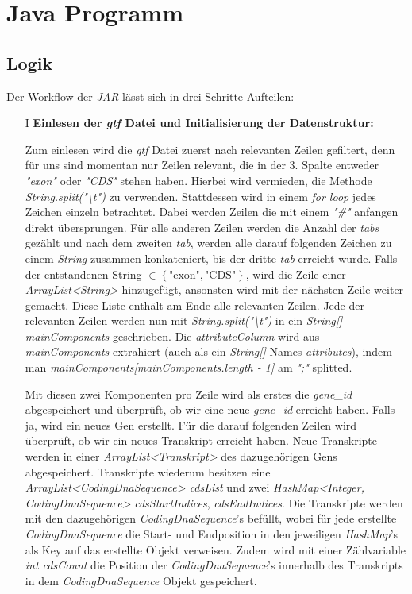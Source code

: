 \documentclass[12pt]{article}
\begin{document}
\section{Java Programm}
\subsection{Logik}
Der Workflow der \textit{JAR} lässt sich in drei Schritte Aufteilen:
\begin{enumerate}
    \item[I] \textbf{Einlesen der \textit{gtf} Datei und Initialisierung der Datenstruktur:}

        Zum einlesen wird die \textit{gtf} Datei zuerst nach relevanten Zeilen gefiltert, denn
        für uns sind momentan nur Zeilen relevant, die in der 3. Spalte entweder
        \textit{"exon"} oder \textit{"CDS"} stehen haben. Hierbei wird vermieden,
        die Methode \textit{String.split("\textbackslash t")} zu verwenden.
        Stattdessen wird in einem \textit{for loop} jedes Zeichen einzeln betrachtet.
        Dabei werden Zeilen die mit einem \textit{"\#"} anfangen direkt übersprungen.
        Für alle anderen Zeilen werden die Anzahl der \textit{tabs} gezählt und nach 
        dem zweiten \textit{tab}, werden alle darauf folgenden Zeichen zu einem 
        \textit{String} zusammen konkateniert, bis der dritte \textit{tab} 
        erreicht wurde. Falls der entstandenen String $\in \left\{\text{"exon"}, \text{"CDS"} \right\}$, wird die 
        Zeile einer \textit{ArrayList<String>} hinzugefügt, ansonsten wird mit der nächsten Zeile weiter gemacht. 
        Diese Liste enthält am Ende alle relevanten Zeilen. 
        Jede der relevanten Zeilen werden nun mit \textit{String.split("\textbackslash t")} in
        ein \textit{String[] mainComponents} geschrieben. Die \textit{attributeColumn} wird aus
        \textit{mainComponents} extrahiert (auch als ein \textit{String[]} Names \textit{attributes}),
        indem man \textit{mainComponents[mainComponents.length - 1]} am \textit{";"} splitted.

        Mit diesen zwei Komponenten pro Zeile wird als erstes die \textit{gene\_id} abgespeichert
        und überprüft, ob wir eine neue \textit{gene\_id} erreicht haben. 
        Falls ja, wird ein neues Gen erstellt. Für die darauf folgenden Zeilen wird überprüft,
        ob wir ein neues Transkript erreicht haben. Neue Transkripte werden in einer
        \textit{ArrayList<Transkript>} des dazugehörigen Gens abgespeichert. 
        Transkripte wiederum besitzen eine \textit{ArrayList<CodingDnaSequence> cdsList} und zwei
        \textit{HashMap<Integer, CodingDnaSequence>} \textit{cdsStartIndices}, \textit{cdsEndIndices}. Die Transkripte werden mit den dazugehörigen
        \textit{CodingDnaSequence}'s befüllt, wobei für jede erstellte \textit{CodingDnaSequence} die Start- und 
        Endposition in den jeweiligen \textit{HashMap}'s als Key auf das erstellte Objekt verweisen.
        Zudem wird mit einer Zählvariable \textit{int cdsCount} die Position der \textit{CodingDnaSequence}'s
        innerhalb des Transkripts in dem \textit{CodingDnaSequence} Objekt gespeichert.


\end{enumerate}
\end{document}
